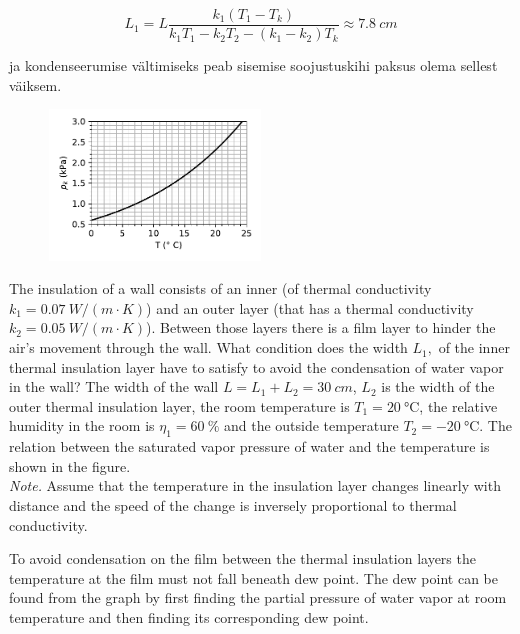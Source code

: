 {\begin{equation*}
L_{1}=L\frac{k_{1}\left(T_{1}-T_{k}\right)}{k_{1}T_{1}-k_{2}T_{2}-\left(k_{1}-k_{2}\right)T_{k}}\approx\SI{7.8}{cm}
\end{equation*}

\noindent ja kondenseerumise vältimiseks peab sisemise soojustuskihi
paksus olema sellest väiksem.
\fi


\ifEngStatement
\begin{figure}
\vspace{-30pt}
\begin{center}
\includegraphics[width=0.5\textwidth]{2018-v3g-05-kullastunud-aur}
\par\end{center} 
\end{figure}
The insulation of a wall consists of an inner (of thermal conductivity $k_{1}=\SI{0.07}{W/\left(m\cdot K\right)}$) and an outer layer (that has a thermal conductivity $k_{2}=\SI{0.05}{W/\left(m\cdot K\right)}$). Between those layers there is a film layer to hinder the air’s movement through the wall. What condition does the width $L_{1},$ of the inner thermal insulation layer have to satisfy to avoid the condensation of water vapor in the wall? The width of the wall $L=L_{1}+L_{2}=\SI{30}{cm}$, $L_{2}$ is the width of the outer thermal insulation layer, the room temperature is $T_{1}=\SI{20}{\celsius}$, the relative humidity in the room is $\eta_{1}=\SI{60}{\percent}$ and the outside temperature $T_{2}=\SI{-20}{\celsius}$. The relation between the saturated vapor pressure of water and the temperature is shown in the figure.\\
\emph{Note.} Assume that the temperature in the insulation layer changes linearly with distance and the speed of the change is inversely proportional to thermal conductivity.
\fi


\ifEngHint
To avoid condensation on the film between the thermal insulation layers the temperature at the film must not fall beneath dew point. The dew point can be found from the graph by first finding the partial pressure of water vapor at room temperature and then finding its corresponding dew point.
\fi


}
